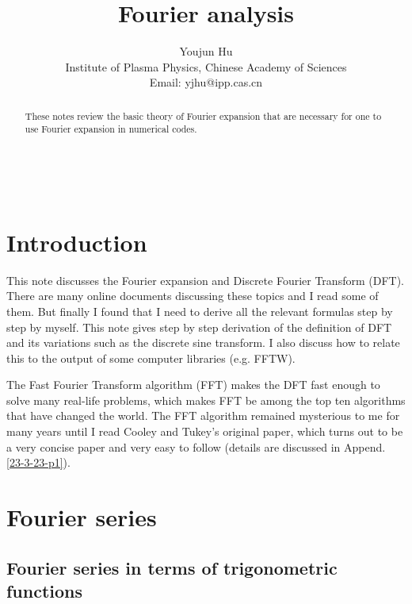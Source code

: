 \documentclass{article}
\newcommand{\tmaffiliation}[1]{\\ #1}
\begin{document}
\

\title{Fourier analysis}

\author{
  Youjun Hu
  \tmaffiliation{Institute of Plasma Physics, Chinese Academy of Sciences\\
  Email: yjhu@ipp.cas.cn}
}

\maketitle

\begin{abstract}
  These notes review the basic theory of Fourier expansion that are necessary
  for one to use Fourier expansion in numerical codes.
\end{abstract}

\section{Introduction}

This note discusses the Fourier expansion and Discrete Fourier Transform
(DFT). There are many online documents discussing these topics and I read some
of them. But finally I found that I need to derive all the relevant formulas
step by step by myself. This note gives step by step derivation of the
definition of DFT and its variations such as the discrete sine transform. I
also discuss how to relate this to the output of some computer libraries (e.g.
FFTW).

The Fast Fourier Transform algorithm (FFT) makes the DFT fast enough to solve
many real-life problems, which makes FFT be among the top ten algorithms that
have changed the world. The FFT algorithm remained mysterious to me for many
years until I read Cooley and Tukey's original paper, which turns out to be a
very concise paper and very easy to follow (details are discussed in Append.
\ref{23-3-23-p1}).

\section{Fourier series}

\subsection{Fourier series in terms of trigonometric functions}
\end{document}
